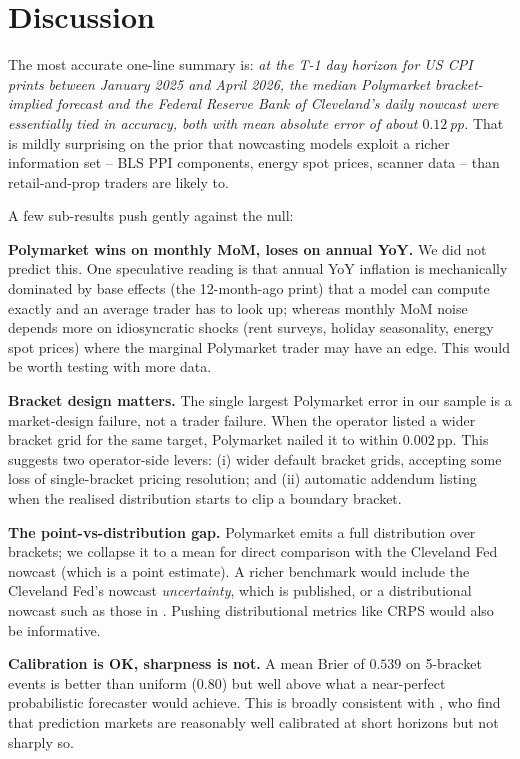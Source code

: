\documentclass{article}
\begin{document}
\section{Discussion}

The most accurate one-line summary is: \emph{at the T-1 day horizon
for US CPI prints between January 2025 and April 2026, the median
Polymarket bracket-implied forecast and the Federal Reserve Bank of
Cleveland's daily nowcast were essentially tied in accuracy, both
with mean absolute error of about $0.12$\,pp.}  That is mildly
surprising on the prior that nowcasting models exploit a richer
information set -- BLS PPI components, energy spot prices, scanner
data -- than retail-and-prop traders are likely to.

A few sub-results push gently against the null:

\textbf{Polymarket wins on monthly MoM, loses on annual YoY.}
We did not predict this.  One speculative reading is that
annual YoY inflation is mechanically dominated by base effects (the
12-month-ago print) that a model can compute exactly and an
average trader has to look up; whereas monthly MoM noise depends more
on idiosyncratic shocks (rent surveys, holiday seasonality, energy
spot prices) where the marginal Polymarket trader may have an edge.
This would be worth testing with more data.

\textbf{Bracket design matters.}  The single largest Polymarket error
in our sample is a market-design failure, not a trader failure.  When
the operator listed a wider bracket grid for the same target,
Polymarket nailed it to within $0.002$\,pp.  This suggests two
operator-side levers: (i) wider default bracket grids, accepting some
loss of single-bracket pricing resolution; and (ii) automatic
addendum listing when the realised distribution starts to clip a
boundary bracket.

\textbf{The point-vs-distribution gap.}  Polymarket emits a full
distribution over brackets; we collapse it to a mean for direct
comparison with the Cleveland Fed nowcast (which is a point
estimate).  A richer benchmark would include the Cleveland Fed's
nowcast \emph{uncertainty}, which is published, or a distributional
nowcast such as those in \citet{knotek2017nowcasting}.  Pushing
distributional metrics like CRPS would also be informative.

\textbf{Calibration is OK, sharpness is not.}  A mean Brier of
$0.539$ on 5-bracket events is better than uniform ($0.80$) but
well above what a near-perfect probabilistic forecaster would
achieve.  This is broadly consistent with \citet{page2013calibration},
who find that prediction markets are reasonably well calibrated at
short horizons but not sharply so.
\end{document}
